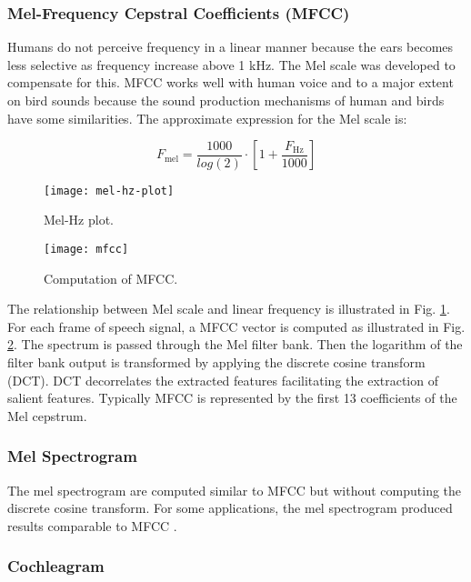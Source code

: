 \subsubsection{Mel-Frequency Cepstral Coefficients (MFCC)}

Humans do not perceive frequency in a linear manner because the ears becomes less selective as frequency increase above 1 kHz. The Mel scale was developed to compensate for this.
MFCC works well with human voice and to a major extent on bird sounds because the sound production mechanisms of human and birds have some similarities. The approximate expression for the Mel scale is:

\[
F_\mathrm{mel} = \frac{1000}{log(2)} \cdot \left[1+\frac{F_\mathrm{Hz}}{1000}\right]
\]


\begin{figure}[h]
    \centering
    \texttt{[image: mel-hz-plot]}
    \caption{Mel-Hz plot.}
    \label{mel-hz-plot}
\end{figure}

\begin{figure}[h]
    \centering
    \texttt{[image: mfcc]}
    \caption{Computation of MFCC.}
    \label{mfcc}
\end{figure}

The relationship between Mel scale and linear frequency  is illustrated in Fig. \ref{mel-hz-plot}.
For each frame of speech signal, a MFCC vector is computed as illustrated in Fig. \ref{mfcc}. The spectrum is passed through the Mel filter bank. Then the logarithm of the filter bank output is transformed by applying the discrete cosine transform (DCT). DCT decorrelates the extracted features facilitating the extraction of salient features. Typically MFCC is represented by the first 13 coefficients of the Mel cepstrum.


\subsubsection{Mel Spectrogram}

The mel spectrogram are computed similar to MFCC but without computing the discrete cosine transform. For some applications, the mel spectrogram produced results comparable to MFCC \cite{Lasseck2018}.

\subsubsection{Cochleagram}


